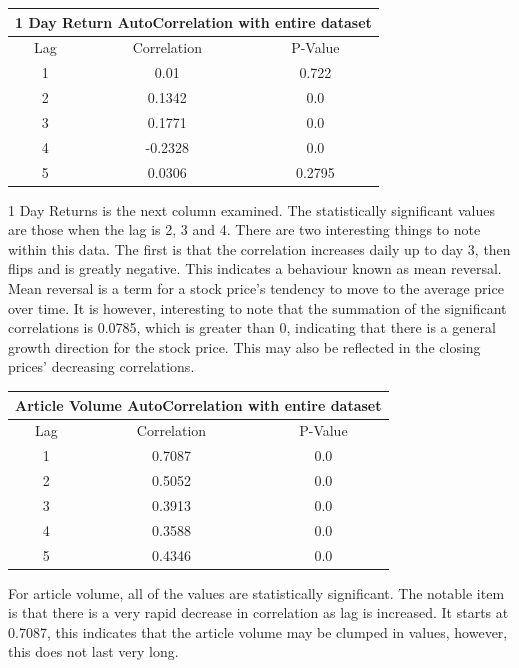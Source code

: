 \begin{center}
\begin{tabular}{ c c c }
\hline
\multicolumn{3}{|c|}{1 Day Return AutoCorrelation with entire dataset} \\
\hline
Lag & Correlation & P-Value \\
\hline
1 & 0.01 & 0.722 \\
2 & 0.1342 & 0.0 \\
3 & 0.1771 & 0.0 \\
4 & -0.2328 & 0.0 \\
5 & 0.0306 & 0.2795 \\
\end{tabular}
\end{center}
1 Day Returns is the next column examined. The statistically significant values are those when the lag is 2, 3 and 4. There are two interesting things to note within this data. The first is that the correlation increases daily up to day 3, then flips and is greatly negative. This indicates a behaviour known as mean reversal. Mean reversal is a term for a stock price's tendency to move to the average price over time. It is however, interesting to note that the summation of the significant correlations is 0.0785, which is greater than 0, indicating that there is a general growth direction for the stock price. This may also be reflected in the closing prices' decreasing correlations.

\begin{center}
\begin{tabular}{ c c c }
\hline
\multicolumn{3}{|c|}{Article Volume AutoCorrelation with entire dataset} \\
\hline
Lag & Correlation & P-Value \\
\hline
1 & 0.7087 & 0.0 \\
2 & 0.5052 & 0.0 \\
3 & 0.3913 & 0.0 \\
4 & 0.3588 & 0.0 \\
5 & 0.4346 & 0.0 \\
\end{tabular}
\end{center}
For article volume, all of the values are statistically significant. The notable item is that there is a very rapid decrease in correlation as lag is increased. It starts at 0.7087, this indicates that the article volume may be clumped in values, however, this does not last very long.


